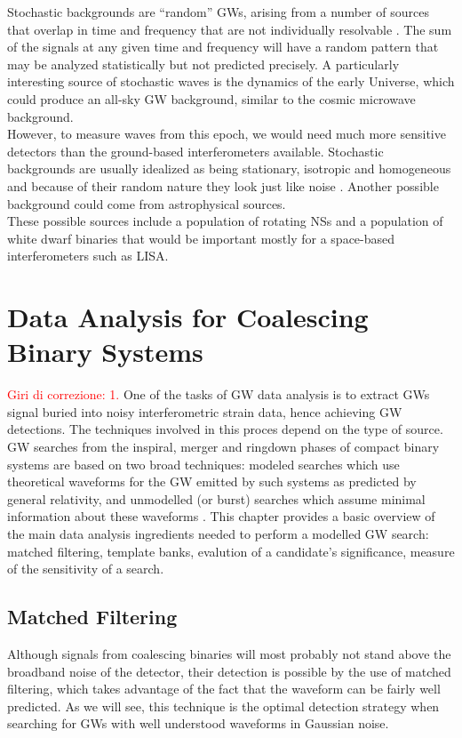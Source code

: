 \documentclass[binding=0.6cm, LaM]{sapthesis}
\newcommand{\fpg}[1]{\textcolor{red}{#1} }
\begin{document}
	Stochastic backgrounds are “random” GWs, 
	arising from a  number of sources that overlap 
	in time and frequency that are not individually resolvable \cite{22}. 
	The sum of the signals at any given time and frequency will have 
	a random pattern that may be analyzed statistically but not predicted precisely.
	A particularly interesting source of stochastic waves is the dynamics of the early Universe, 
	which could produce an all-sky GW background, 
	similar to the cosmic microwave background. \\ 
	However, to measure waves from this epoch, 
	we would need much more sensitive detectors than the ground-based interferometers available.
	Stochastic backgrounds are usually idealized as being stationary, 
	isotropic and homogeneous and because of their random nature they look just like noise \cite{4}.	
	Another possible background could come from astrophysical sources. \\ 
	These possible sources include a population of rotating NSs 
	and a population of white dwarf binaries that would be important mostly for a space-based interferometers such as LISA. 

\chapter{Data Analysis for Coalescing Binary Systems}
\label{ch:datatools}
\fpg{Giri di correzione: 1.}%
	One of the tasks of GW data analysis is to extract GWs signal 
	buried into noisy interferometric strain data, hence achieving GW detections.
	The techniques involved in this proces depend on the type of source.
	GW searches from the inspiral, merger and ringdown phases of compact binary systems 
	are based on two broad techniques: 
	modeled searches which use theoretical waveforms for the GW emitted by such systems 
	as predicted by general relativity, and 
	unmodelled (or burst) searches which assume minimal information about these waveforms \cite{23}.
        This chapter provides a basic overview of the main data analysis ingredients needed to perform a modelled GW search:
        matched filtering, template banks, evalution of a candidate's significance, measure of the sensitivity of a search.

\section{Matched Filtering}
\label{sec:matched_filtering}
	Although signals from coalescing binaries will most probably not stand above the broadband noise of the detector, 
	their detection is possible by the use of matched filtering, 
	which takes advantage of the fact that the waveform can be fairly well predicted. 
	As we will see, this technique is the optimal detection strategy when searching for GWs
        with well understood waveforms in Gaussian noise.
\end{document}
